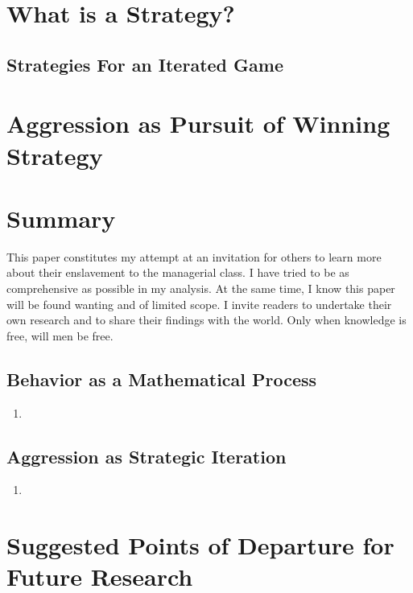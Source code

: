 \documentclass[12pt]{article}
\begin{document}
\section{What is a Strategy?}
\subsection{Strategies For an Iterated Game}

\section{Aggression as Pursuit of Winning Strategy}

\section{Summary}
This paper constitutes my attempt at an invitation for others to learn more about their enslavement to the managerial class.
I have tried to be as comprehensive as possible in my analysis.
At the same time, I know this paper will be found wanting and of limited scope.
I invite readers to undertake their own research and to share their findings with the world.
Only when knowledge is free, will men be free.

\subsection{Behavior as a Mathematical Process}
\begin{enumerate}
    \item 
\end{enumerate}
\subsection{Aggression as Strategic Iteration}
\begin{enumerate}
    \item 
\end{enumerate}

\section{Suggested Points of Departure for Future Research}
\end{document}
